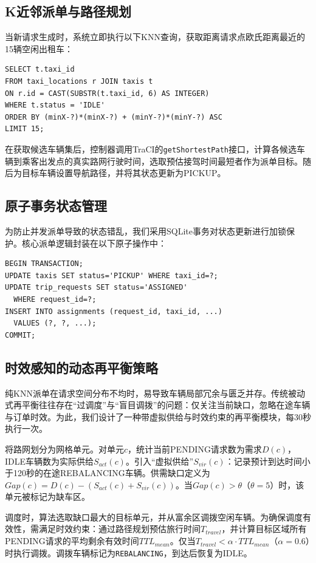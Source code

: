 \documentclass[conference]{IEEEtran}
\begin{document}
\subsection{K近邻派单与路径规划}
当新请求生成时，系统立即执行以下KNN查询，获取距离请求点欧氏距离最近的15辆空闲出租车：

\begin{verbatim}
SELECT t.taxi_id
FROM taxi_locations r JOIN taxis t 
ON r.id = CAST(SUBSTR(t.taxi_id, 6) AS INTEGER)
WHERE t.status = 'IDLE'
ORDER BY (minX-?)*(minX-?) + (minY-?)*(minY-?) ASC 
LIMIT 15;
\end{verbatim}

在获取候选车辆集后，控制器调用TraCI的\texttt{getShortestPath}接口，计算各候选车辆到乘客出发点的真实路网行驶时间，选取预估接驾时间最短者作为派单目标。随后为目标车辆设置导航路径，并将其状态更新为PICKUP。

\subsection{原子事务状态管理}
为防止并发派单导致的状态错乱，我们采用SQLite事务对状态更新进行加锁保护。核心派单逻辑封装在以下原子操作中：

\begin{verbatim}
BEGIN TRANSACTION;
UPDATE taxis SET status='PICKUP' WHERE taxi_id=?;
UPDATE trip_requests SET status='ASSIGNED' 
  WHERE request_id=?;
INSERT INTO assignments (request_id, taxi_id, ...) 
  VALUES (?, ?, ...);
COMMIT;
\end{verbatim}

\subsection{时效感知的动态再平衡策略}
纯KNN派单在请求空间分布不均时，易导致车辆局部冗余与匮乏并存。传统被动式再平衡往往存在“过调度”与“盲目调拨”的问题：仅关注当前缺口，忽略在途车辆与订单时效。为此，我们设计了一种带虚拟供给与时效约束的再平衡模块，每30秒执行一次。

将路网划分为网格单元。对单元\(c\)，统计当前PENDING请求数为需求\(D(c)\)，IDLE车辆数为实际供给\(S_{act}(c)\)。引入“虚拟供给”\(S_{vir}(c)\)：记录预计到达时间小于120秒的在途REBALANCING车辆。供需缺口定义为\(Gap(c)=D(c)-(S_{act}(c)+S_{vir}(c))\)。当\(Gap(c)>\theta\)（\(\theta=5\)）时，该单元被标记为缺车区。

调度时，算法选取缺口最大的目标单元，并从富余区调拨空闲车辆。为确保调度有效性，需满足时效约束：通过路径规划预估旅行时间\(T_{travel}\)，并计算目标区域所有PENDING请求的平均剩余有效时间\(TTL_{mean}\)。仅当\(T_{travel}<\alpha\cdot TTL_{mean}\)（\(\alpha=0.6\)）时执行调拨。调拨车辆标记为\texttt{REBALANCING}，到达后恢复为IDLE。
\end{document}
